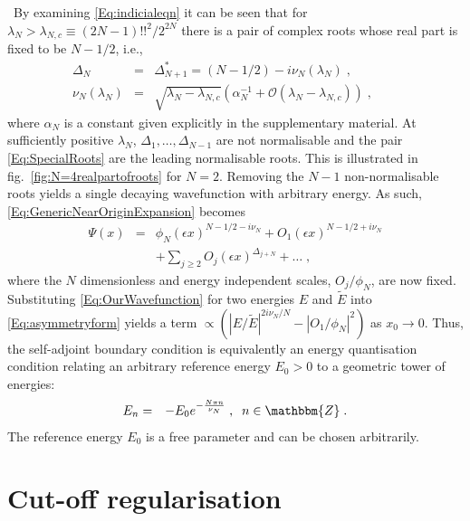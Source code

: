 \documentclass[aps,prl,reprint,preprintnumbers]{revtex4-1}
\begin{document}
{\ By examining \eqref{Eq:indicialeqn} it can be seen that for $\lambda_{N} > \lambda_{N,c} \equiv (2N-1)!!^{2}/2^{2N}$ there is a pair of complex roots whose real part is fixed to be $N-1/2$, i.e.,
  \begin{eqnarray}
   \label{Eq:SpecialRoots}
   \Delta_{N}&=&\Delta^{*}_{N+1}= (N-1/2) - i \nu_{N}(\lambda_{N}) \; , \\
   \label{Eq:nuintermsoflambdacrit}
   \nu_{N}(\lambda_{N}) &=& \sqrt{\lambda_{N} - \lambda_{N,c}} \left( \alpha_{N}^{-1} + \mathcal{O}(\lambda_{N} - \lambda_{N,c}) \right) \; , \qquad
  \end{eqnarray}
where $\alpha_{N}$ is a constant given explicitly in the supplementary material. At sufficiently positive $\lambda_{N}$, $\Delta_{1},\dots,\Delta_{N-1}$ are not normalisable and the pair \eqref{Eq:SpecialRoots} are the leading normalisable roots. This is illustrated in fig.~\ref{fig:N=4realpartofroots} for $N=2$. Removing the $N-1$ non-normalisable roots yields a single decaying wavefunction with arbitrary energy. As such, \eqref{Eq:GenericNearOriginExpansion} becomes 
  \begin{eqnarray}
   \label{Eq:OurWavefunction}
   \Psi(x) &=& \phi_{N} \left( \epsilon x \right)^{N-1/2-i\nu_{N}} + O_{1} \left( \epsilon x \right)^{N-1/2 + i \nu_{N}} \nonumber \\
	   &\;& + \sum_{j \geq 2}  O_{j} \left( \epsilon x \right)^{\Delta_{j+N}} + \ldots \; , \qquad
  \end{eqnarray}
where the $N$ dimensionless and energy independent scales, $O_{j}/\phi_{N}$, are now fixed. Substituting \eqref{Eq:OurWavefunction} for two energies $E$ and $\tilde{E}$ into \eqref{Eq:asymmetryform} yields a term $\propto ( |E/\tilde{E}|^{2 i \nu_{N}/N} - |O_{1}/\phi_{N}|^2 )$ as $x_{0} \rightarrow 0$. Thus, the self-adjoint boundary condition is equivalently an energy quantisation condition relating an arbitrary reference energy $E_{0}>0$ to a geometric tower of energies:
  \begin{eqnarray}
   \label{Eq:selfadjointenergies}
    E_{n} &=& - E_{0} e^{- \frac{N \pi n}{\nu_{N}}} \; , \; \; n \in \mathbbm{Z} \; . 
  \end{eqnarray}
The reference energy $E_{0}$ is a free parameter and can be chosen arbitrarily.}

\section{Cut-off regularisation}
\end{document}
